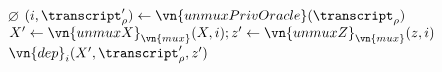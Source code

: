\begin{algorithmic}
    \If{$\transcript_\rho = \epsilon$}
      \Return $\varnothing$
    \Else
      \State \Let $(i, \transcript_\rho') \gets \vn{unmuxPrivOracle}(\transcript_\rho)$
      \State \Let $X' \gets \vn{unmuxX}_{\vn{mux}}(X, i); z' \gets
        \vn{unmuxZ}_{\vn{mux}}(z, i)$
      \State \Return $\vn{dep}_i(X', \transcript_\rho', z')$
    \EndIf
  \EndFunction
\end{algorithmic}
